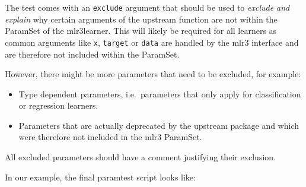 \documentclass[
]{scrbook}
\providecommand{\tightlist}{%
  \setlength{\itemsep}{0pt}\setlength{\parskip}{0pt}}
\begin{document}
The test comes with an \texttt{exclude} argument that should be used to \emph{exclude and explain} why certain arguments of the upstream function are not within the ParamSet of the mlr3learner. This will likely be required for all learners as common arguments like \texttt{x}, \texttt{target} or \texttt{data} are handled by the mlr3 interface and are therefore not included within the ParamSet.

However, there might be more parameters that need to be excluded, for example:

\begin{itemize}
\tightlist
\item
  Type dependent parameters, i.e.~parameters that only apply for classification or regression learners.
\item
  Parameters that are actually deprecated by the upstream package and which were therefore not included in the mlr3 ParamSet.
\end{itemize}

All excluded parameters should have a comment justifying their exclusion.

In our example, the final paramtest script looks like:
\end{document}
